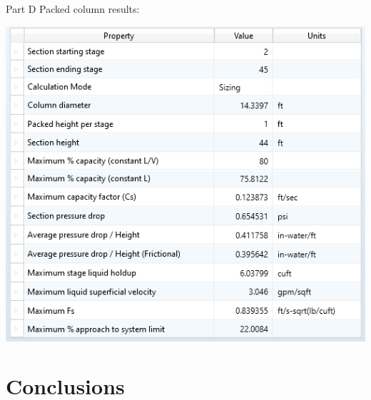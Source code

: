 \documentclass[12pt]{article}
\begin{document}
Part D Packed column results:
\begin{center}
    \includegraphics{packing results.png}
\end{center}


\section{Conclusions}
\end{document}
